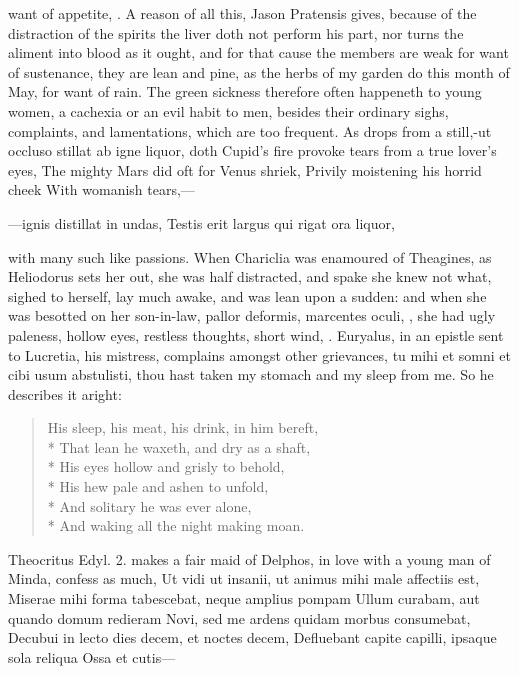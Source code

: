 {want of appetite, \etc{}. A reason of all this, Jason Pratensis
gives, because of the distraction of the spirits the liver doth not
perform his part, nor turns the aliment into blood as it ought, and for
that cause the members are weak for want of sustenance, they are lean
and pine, as the herbs of my garden do this month of May, for want of
rain. The green sickness therefore often happeneth to young women, a
cachexia or an evil habit to men, besides their ordinary sighs,
complaints, and lamentations, which are too frequent. As drops from a
still,-ut occluso stillat ab igne liquor, doth Cupid's fire provoke
tears from a true lover's eyes,
The mighty Mars did oft for Venus shriek,
Privily moistening his horrid cheek
With womanish tears,---

---ignis distillat in undas,
Testis erit largus qui rigat ora liquor,

with many such like passions. When Chariclia was enamoured of
Theagines, as Heliodorus sets her out, she was half distracted,
and spake she knew not what, sighed to herself, lay much awake, and was
lean upon a sudden: and when she was besotted on her son-in-law,
pallor deformis, marcentes oculi, \etc{}, she had ugly paleness,
hollow eyes, restless thoughts, short wind, \etc{}. Euryalus, in an epistle
sent to Lucretia, his mistress, complains amongst other grievances, tu
mihi et somni et cibi usum abstulisti, thou hast taken my stomach and
my sleep from me. So he describes it aright:
%
{\gothfont
\begin{verse}
His sleep, his meat, his drink, in him bereft,\\*
That lean he waxeth, and dry as a shaft,\\*
His eyes hollow and grisly to behold,\\*
His hew pale and ashen to unfold,\\*
And solitary he was ever alone,\\*
And waking all the night making moan.
\end{verse}
}
%
Theocritus Edyl. 2. makes a fair maid of Delphos, in love with a young
man of Minda, confess as much,
Ut vidi ut insanii, ut animus mihi male affectiis est,
Miserae mihi forma tabescebat, neque amplius pompam
Ullum curabam, aut quando domum redieram
Novi, sed me ardens quidam morbus consumebat,
Decubui in lecto dies decem, et noctes decem,
Defluebant capite capilli, ipsaque sola reliqua
Ossa et cutis---

}
